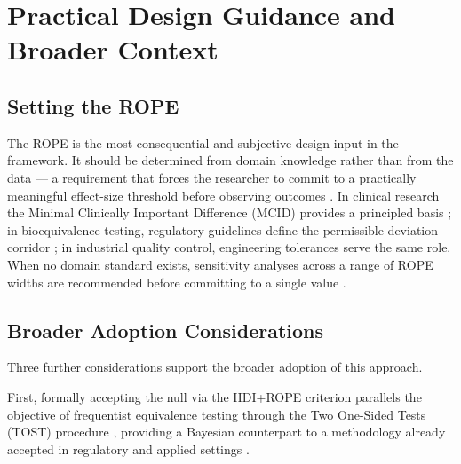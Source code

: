 \section{Practical Design Guidance and Broader Context}\label{app:practical_guidance}

\subsection*{Setting the ROPE}

The ROPE is the most consequential and subjective design input in the framework.
It should be determined from domain knowledge rather than from the data ---
a requirement that forces the researcher to commit to a practically meaningful
effect-size threshold before observing outcomes \citep{kruschke2018}.
In clinical research the Minimal Clinically Important Difference (MCID) provides a
principled basis \citep{jaeschke1989}; in bioequivalence testing, regulatory guidelines
define the permissible deviation corridor \citep{schuirmann1987}; in industrial quality
control, engineering tolerances serve the same role.
When no domain standard exists, sensitivity analyses across a range of ROPE widths
are recommended before committing to a single value \citep{lakens2018}.

\subsection*{Broader Adoption Considerations}

Three further considerations support the broader adoption of this approach.

First, formally accepting the null via the HDI+ROPE criterion parallels the objective
of frequentist equivalence testing through the Two One-Sided Tests (TOST) procedure
\citep{schuirmann1987, lakens2018}, providing a Bayesian counterpart to a methodology
already accepted in regulatory and applied settings \citep{fda2010bayesian}.

